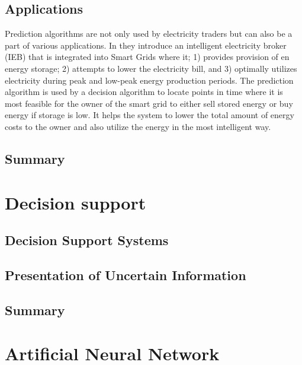 \documentclass[twoside,11pt,openright]{report}
\begin{document}
\subsection{Applications}
Prediction algorithms are not only used by electricity traders but can also be a part of various applications. In \cite{22} they introduce an intelligent electricity broker (IEB) that is integrated into Smart Grids where it; 1) provides provision of en energy storage; 2) attempts to lower the electricity bill, and 3) optimally utilizes electricity during peak and low-peak energy production periods. The prediction algorithm is used by a decision algorithm to locate points in time where it is most feasible for the owner of the smart grid to either sell stored energy or buy energy if storage is low. It helps the system to lower the total amount of energy costs to the owner and also utilize the energy in the most intelligent way.
\\[0.5cm]


\subsection{Summary}

\section{Decision support}
\subsection{Decision Support Systems}

\subsection{Presentation of Uncertain Information}

\subsection{Summary}


\section{Artificial Neural Network}


\end{document}
